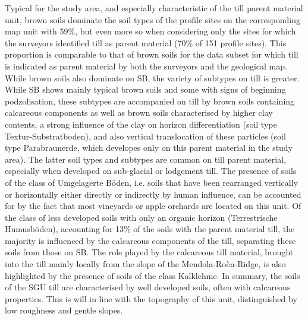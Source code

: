 \documentclass[preprint,12pt,authoryear]{elsarticle}
\begin{document}
 Typical for the study area, and especially characteristic of the till parent material unit, brown soils dominate the soil types of the profile sites on the corresponding  map unit with 59\%, but even more so when considering only the sites for which the surveyors identified till as parent material (70\% of 151 profile sites). This proportion is comparable to that of brown soils for the data subset for which till is indicated as parent material by both the surveyors and the geological map. While brown soils also dominate on SB, the variety of subtypes on till is greater. While SB shows mainly typical brown soils and some with signs of beginning podzolisation, these subtypes are accompanied on till by brown soils containing calcareous components as well as brown soils characterised by higher clay contents, a strong influence of the clay on horizon differentiation (soil type Textur-Substratboden), and also vertical translocation of these particles (soil type Parabraunerde, which developes only on this parent material in the study area). The latter soil types and subtypes are common on till parent material, especially when developed on sub-glacial or lodgement till.  The presence of soils of the class of Umgelagerte B\"oden, i.e. soils that have been rearranged vertically or horizontally either directly or indirectly by human influence, can be accounted for by the fact that most vineyards or apple orchards are located on this unit. Of the class of less developed soils with only an organic horizon (Terrestrische Humusb\"oden), accounting for 13\% of the soils with the parent material till, the majority is influenced by the calcareous components of the till, separating these soils from those on SB. The role played by the calcareous till material, brought into the till mainly locally from the slope of the Mendola-Ro\`en-Ridge, is also highlighted by the presence of soils of the class Kalklehme. In summary, the soils of the SGU till are characterised by well developed soils, often with calcareous properties. This is will in line with the topography of this unit, distinguished by low roughness and gentle slopes.
\end{document}
